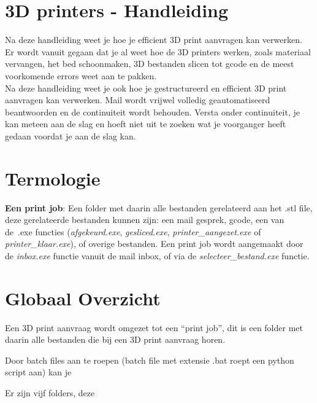 \documentclass{article}
\newcommand{\quotes}[1]{``#1''}
\begin{document}
\pagestyle{empty}
\large

\section*{\centering\hspace{-1cm}3D printers - Handleiding}
Na deze handleiding weet je hoe je efficient 3D print aanvragen kan verwerken. Er wordt vanuit gegaan dat je al weet hoe de 3D printers werken, zoals materiaal vervangen, het bed schoonmaken, 3D bestanden slicen tot gcode en de meest voorkomende errors weet aan te pakken.\\

Na deze handleiding weet je ook hoe je gestructureerd en efficient 3D print aanvragen kan verwerken. Mail wordt vrijwel volledig geautomatiseerd beantwoorden en de continuiteit wordt behouden. Versta onder continuiteit, je kan meteen aan de slag en hoeft niet uit te zoeken wat je voorganger heeft gedaan voordat je aan de slag kan.\\


\section*{Termologie}
\noindent\textbf{Een print job}: Een folder met daarin alle bestanden gerelateerd aan het .stl file, deze gerelateerde bestanden kunnen zijn: een mail gesprek, gcode, een van de~.exe functies (\textit{afgekeurd.exe}, \textit{gesliced.exe}, \textit{printer\_aangezet.exe} of \textit{printer\_klaar.exe}), of overige bestanden. Een print job wordt aangemaakt door de \textit{inbox.exe} functie vanuit de mail inbox, of via de \textit{selecteer\_bestand.exe} functie.\\



\section*{Globaal Overzicht}
Een 3D print aanvraag wordt omgezet tot een \quotes{print job}, dit is een folder met daarin alle bestanden die bij een 3D print aanvraag horen. 



Door batch files aan te roepen (batch file met extensie .bat roept een python script aan) kan je 


Er zijn vijf folders, deze 
\end{document}
